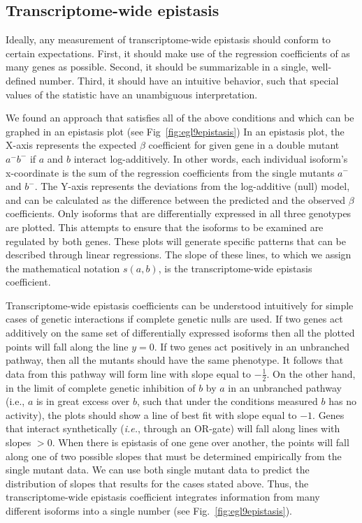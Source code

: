 \documentclass[9pt,twocolumn,twoside]{pnas-new}
\begin{document}
\subsection*{Transcriptome-wide epistasis}
Ideally, any measurement of transcriptome-wide epistasis should conform to
certain expectations. First, it should make use of the regression coefficients
of as many genes as possible. Second, it should be summarizable in a single,
well-defined number. Third, it should have an intuitive behavior, such that
special values of the statistic have an unambiguous interpretation.

We found an approach that satisfies all of the above conditions and which can
be graphed in an epistasis plot (see Fig~\ref{fig:egl9epistasis})
In an epistasis plot, the X-axis represents the expected $\beta$ coefficient for
given gene in a double
mutant $a^-b^-$ if $a$ and $b$ interact log-additively. In other words, each
individual isoform's x-coordinate is the sum of the regression coefficients from
the single mutants $a^-$ and $b^-$. The Y-axis represents the deviations from
the log-additive (null) model, and can be calculated as the difference between
the predicted and the observed $\beta$ coefficients.
Only isoforms that are differentially expressed in all three genotypes are plotted.
This attempts to ensure that the isoforms to be examined are regulated by both genes.
These plots will generate specific patterns that can be described through linear
regressions. The slope of these lines, to which we assign the mathematical
notation $s({a,b})$, is the transcriptome-wide epistasis coefficient.

Transcriptome-wide epistasis coefficients can be understood intuitively for
simple cases of genetic interactions if complete genetic nulls are used. If two
genes act additively on the same set of differentially expressed isoforms then
all the plotted points will fall along the line $y=0$. If two genes act
positively in an unbranched pathway, then all the mutants should have the same
phenotype. It follows that data from this pathway will form line with slope
equal to $-\frac{1}{2}$. On the other hand, in the limit of complete genetic
inhibition of $b$ by $a$ in an unbranched pathway (i.e., $a$ is in great excess
over $b$, such that under the conditions measured $b$ has no activity), the
plots should show a line of best fit with slope equal to $-1$. Genes that
interact synthetically (\emph{i.e.}, through an OR-gate) will fall along lines
with slopes $>0$. When there is epistasis of one gene over another, the points
will fall along one of two possible slopes that must be determined empirically
from the single mutant data. We can use both single mutant data to predict the
distribution of slopes that results for the cases stated above. Thus, the
transcriptome-wide epistasis coefficient integrates information from many
different isoforms into a single number (see Fig.~\ref{fig:egl9epistasis}).
\end{document}
